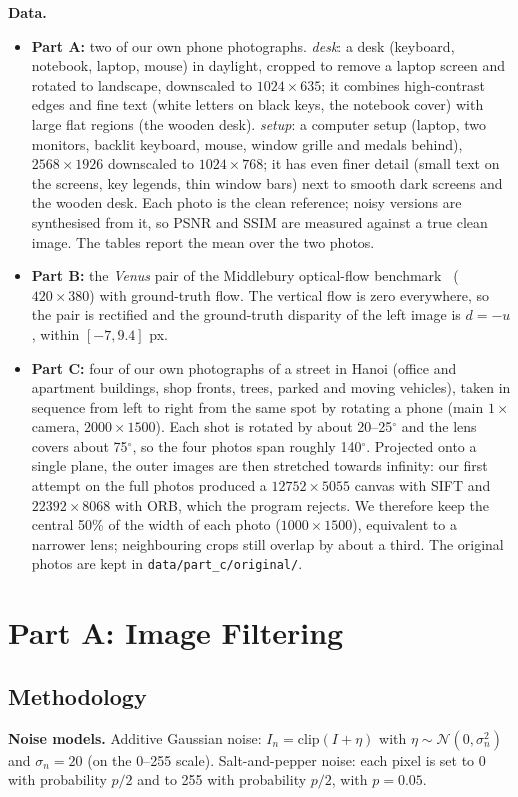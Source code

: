 \documentclass[a4paper,12pt]{article}
\begin{document}
\textbf{Data.}
\begin{itemize}[nosep]
    \item \textbf{Part A:} two of our own phone photographs. \emph{desk}: a desk (keyboard, notebook, laptop, mouse) in daylight, cropped to remove a laptop screen and rotated to landscape, downscaled to $1024\times635$; it combines high-contrast edges and fine text (white letters on black keys, the notebook cover) with large flat regions (the wooden desk). \emph{setup}: a computer setup (laptop, two monitors, backlit keyboard, mouse, window grille and medals behind), $2568\times1926$ downscaled to $1024\times768$; it has even finer detail (small text on the screens, key legends, thin window bars) next to smooth dark screens and the wooden desk. Each photo is the clean reference; noisy versions are synthesised from it, so PSNR and SSIM are measured against a true clean image. The tables report the mean over the two photos.
    \item \textbf{Part B:} the \emph{Venus} pair of the Middlebury optical-flow benchmark~\cite{baker2011} ($420\times380$) with ground-truth flow. The vertical flow is zero everywhere, so the pair is rectified and the ground-truth disparity of the left image is $d=-u$, within $[-7, 9.4]$ px.
    \item \textbf{Part C:} four of our own photographs of a street in Hanoi (office and apartment buildings, shop fronts, trees, parked and moving vehicles), taken in sequence from left to right from the same spot by rotating a phone (main $1\times$ camera, $2000\times1500$). Each shot is rotated by about 20--25$^\circ$ and the lens covers about 75$^\circ$, so the four photos span roughly 140$^\circ$. Projected onto a single plane, the outer images are then stretched towards infinity: our first attempt on the full photos produced a $12752\times5055$ canvas with SIFT and $22392\times8068$ with ORB, which the program rejects. We therefore keep the central 50\% of the width of each photo ($1000\times1500$), equivalent to a narrower lens; neighbouring crops still overlap by about a third. The original photos are kept in \texttt{data/part\_c/original/}.
\end{itemize}

\section{Part A: Image Filtering}\label{sec:A}
\subsection{Methodology}
\textbf{Noise models.} Additive Gaussian noise: $I_n=\mathrm{clip}(I+\eta)$ with $\eta\sim\mathcal N(0,\sigma_n^2)$ and $\sigma_n=20$ (on the 0--255 scale). Salt-and-pepper noise: each pixel is set to 0 with probability $p/2$ and to 255 with probability $p/2$, with $p=0.05$.
\end{document}
